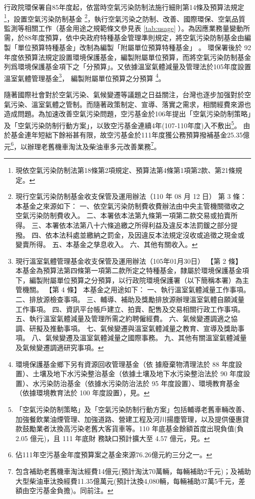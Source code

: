 \documentclass[12pt,a4paper]{article}
\begin{document}
行政院環保署自85年度起，依當時空氣污染防制法施行細則第14條及預算法規定\footnote{現依空氣污染防制法第18條第2項規定、預算法第4條第1項第2款、第21條規定。}，設置空氣污染防制基金
\footnote{
  現行空氣污染防制基金收支保管及運用辦法（110 年 08 月 12 日）
  第 3 條：
本基金之來源如下：
一、依空氣污染防制費收費辦法由中央主管機關徵收之空氣污染防制費收入。
二、本署依本法第九條第一項第二款交易或拍賣所得。
三、本署依本法第八十六條追繳之所得利益及違反本法罰鍰之部分提撥。
四、依本法科處並繳納之罰金，及因違反本法規定沒收或追徵之現金或變賣所得。
五、本基金之孳息收入。
六、其他有關收入。}，執行空氣污染之防制、改善、國際環保、空氣品質監測等相關工作（基金用途之規範條文參見表 \ref{tab:usage} ）。為因應業務量變動所需，於88年度預算，依中央政府特種基金管理準則規定，將空氣污染防制基金由編製「單位預算特種基金」改制為編製「附屬單位預算特種基金」
。
環保署後於 92 年度依預算法規定設置環境保護基金，編製附屬單位預算，而將空氣污染防制基金列爲環境保護基金項下之「分預算」。又依據溫室氣體減量及管理法於105年度設置溫室氣體管理基金\footnote{現行溫室氣體管理基金收支保管及運用辦法（105年01月30日）
【第 2 條】
本基金為預算法第四條第一項第二款所定之特種基金，隸屬於環境保護基金項下，編製附屬單位預算之分預算，以行政院環境保護署（以下簡稱本署）為主管機關。
【第 4 條】
本基金之用途如下：
一、執行溫室氣體減量工作事項。
二、排放源檢查事項。
三、輔導、補助及獎勵排放源辦理溫室氣體自願減量工作事項。
四、資訊平台帳戶建立、拍賣、配售及交易相關行政工作事項。
五、執行溫室氣體減量及管理所需之約聘僱經費。
六、氣候變遷調適之協調、研擬及推動事項。
七、氣候變遷與溫室氣體減量之教育、宣導及獎助事項。
八、氣候變遷及溫室氣體減量之國際事務。
九、其他有關溫室氣體減量及氣候變遷調適研究事項。
}，
編製附屬單位預算之分預算
\footnote{環境保護基金鄉下另有資源回收管理基金（依
據廢棄物清理法於 88 年度設置）、土壤及地下水污染整治基金（依據土壤及地下水污染整治法於 90 年度設置）、水污染防治基金（依據水污染防治法於 95 年度設置）、環境教育基金（依據環境教育法於 100 年度設置），見。}。

隨著國際社會對於空氣污染、氣候變遷等議題之日益關注，台灣也逐步加强對於空氣污染、溫室氣體之管制。而隨著政策制定、宣導、落實之需求，相關經費來源也造成問題。為加速改善空氣污染問題，空污基金於106年提出「空氣污染防制策略」及「空氣污染防制行動方案」，以致空污基金連續4年(107-110年度)入不敷出\footnote{「空氣污染防制策略」及「空氣污染防制行動方案」包括輔導老舊車輛改善、加強餐飲業油煙管理、加強道路、營建工程及河川揚塵管理，以及提供優惠貸款鼓勵業者汰換高污染老舊大客貨車等。110 年底基金餘額首度出現負值(負 2.05 億元)，且 111 年底財
務缺口預計擴大至 4.57 億元，見。}。
由於基金連年短絀下餘裕甚有限，故空污基金於111年度獲公務預算撥補基金25.35億元\footnote{佔111年空污基金年度預算案之基金來源76.26億元約三分之一。}，以辦理老舊機車淘汰及柴油車多元改善業務\footnote{包含補助老舊機車淘汰經費14億元(預計淘汰70萬輛，每輛補助2千元)；及補助大型柴油車汰換經費11.35億萬元(預計汰換4,080輛，每輛補助37萬5千元，差額由空污基金負擔)。同前注。}。
\end{document}
